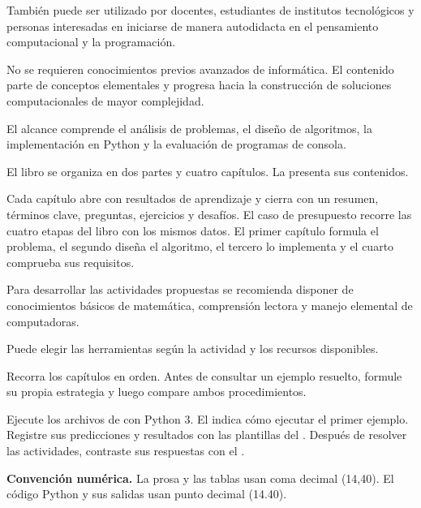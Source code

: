 También puede ser utilizado por docentes, estudiantes de institutos tecnológicos y personas interesadas en iniciarse de manera autodidacta en el pensamiento computacional y la programación.

No se requieren conocimientos previos avanzados de informática. El contenido parte de conceptos elementales y progresa hacia la construcción de soluciones computacionales de mayor complejidad.

El alcance comprende el análisis de problemas, el diseño de algoritmos, la implementación en Python y la evaluación de programas de consola.


El libro se organiza en dos partes y cuatro capítulos. La  presenta sus contenidos.



Cada capítulo abre con resultados de aprendizaje y cierra con un resumen, términos clave, preguntas, ejercicios y desafíos. El caso de presupuesto recorre las cuatro etapas del libro con los mismos datos. El primer capítulo formula el problema, el segundo diseña el algoritmo, el tercero lo implementa y el cuarto comprueba sus requisitos.


Para desarrollar las actividades propuestas se recomienda disponer de conocimientos básicos de matemática, comprensión lectora y manejo elemental de computadoras.



Puede elegir las herramientas según la actividad y los recursos disponibles.


Recorra los capítulos en orden. Antes de consultar un ejemplo resuelto, formule su propia estrategia y luego compare ambos procedimientos.

Ejecute los archivos de  con Python 3. El  indica cómo ejecutar el primer ejemplo. Registre sus predicciones y resultados con las plantillas del . Después de resolver las actividades, contraste sus respuestas con el .

\textbf{Convención numérica.} La prosa y las tablas usan coma decimal (14,40). El código Python y sus salidas usan punto decimal (14.40).
